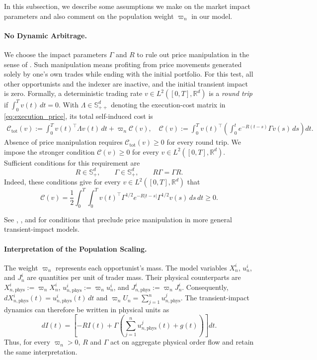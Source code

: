 \documentclass[12pt]{article}
\numberwithin{equation}{section}
\theoremstyle{definition}
\begin{document}
In this subsection, we describe some assumptions we make on the market impact parameters and
also comment on the population weight \(\varpi_n\) in our model.


\paragraph{No Dynamic Arbitrage.} We choose the impact parameters \(\Gamma\) and \(R\) to rule out price
manipulation in the sense of \citet{huberman_stanzl}. Such manipulation means
profiting from price movements generated solely by one's own trades while
ending with the initial portfolio. For this test, all other opportunists and
the indexer are inactive, and the initial transient impact is zero.
Formally, a deterministic trading rate
\(v\in L^2([0,T],\mathbb R^d)\) is a \emph{round trip} if
\(\int_0^T v(t)\,dt=0\). With \(\Lambda\in\mathbb S_{++}^d\) denoting the
execution-cost matrix in \eqref{eq:execution_price}, its total self-induced
cost is
\begin{align*}
\mathcal C_{\mathrm{tot}}(v)
:=
\int_0^T v(t)^\top\Lambda v(t)\,dt+\varpi_n\mathcal C(v),\quad\mathcal C(v)
:=
\int_0^T v(t)^\top
\left(\int_0^t e^{-R(t-s)}\Gamma v(s)\,ds\right)dt.
\end{align*}
Absence of price manipulation requires \(\mathcal C_{\mathrm{tot}}(v)\geq 0\)
for every round trip. We impose the stronger condition
\(\mathcal C(v)\geq 0\) for every
\(v\in L^2([0,T],\mathbb R^d)\). Sufficient conditions for this requirement are
\begin{equation}\label{eq:transient_kernel_parameter_conditions}
R\in\mathbb S_+^d,
\qquad
\Gamma\in\mathbb S_+^d,
\qquad
R\Gamma=\Gamma R.
\end{equation}
Indeed, these conditions give for every
\(v\in L^2([0,T],\mathbb R^d)\) that
\begin{equation}\label{eq:transient_kernel_psd}
\mathcal C(v)
=
\frac{1}{2}\int_0^T\int_0^T
v(t)^\top\Gamma^{1/2}e^{-R\lvert t-s\rvert}
\Gamma^{1/2}v(s)\,ds\,dt
\geq 0.
\end{equation}

See \citet{jaber2026}, \citet{alfonsi2016}, and
\citet{gatheral_2012} for conditions that preclude price
manipulation in more general transient-impact models.

\paragraph{Interpretation of the Population Scaling.}
The weight $\varpi_n$ represents each opportunist's mass. The model variables
$X_n^i$, $u_n^i$, and $J_n^i$ are quantities per unit of trader mass. Their
physical counterparts are
\(X_{n,\mathrm{phys}}^i:=\varpi_nX_n^i\),
\(u_{n,\mathrm{phys}}^i:=\varpi_nu_n^i\), and
\(J_{n,\mathrm{phys}}^i:=\varpi_nJ_n^i\).
Consequently, $dX_{n,\mathrm{phys}}^i(t)
=u_{n,\mathrm{phys}}^i(t)\,dt$ and
$\varpi_nU_n=\sum_{j=1}^n u_{n,\mathrm{phys}}^j$. The transient-impact
dynamics can therefore be written in physical units as
\[
dI(t)
=
\left[
-RI(t)
+
\Gamma\left(
\sum_{j=1}^n u_{n,\mathrm{phys}}^j(t)+g(t)
\right)
\right]dt.
\]
Thus, for every $\varpi_n>0$, $R$ and $\Gamma$ act on aggregate physical order
flow and retain the same interpretation.
\end{document}
